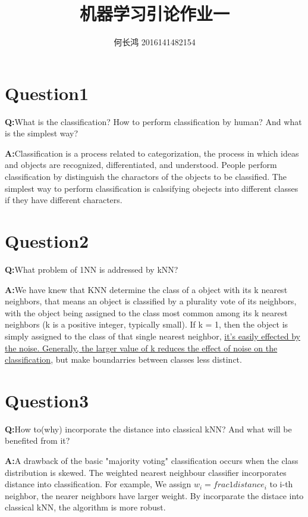 \documentclass{xcumcmart}
\title{机器学习引论作业一}
\author{何长鸿 2016141482154}
\begin{document}
\renewcommand\arraystretch{2}
\maketitle
\section{Question1}
\textbf{Q:}What is the classification? How to perform classification by human? And what is the simplest way?\\
\par \textbf{A:}Classification is a process related to categorization, the process in which ideas and objects are recognized, differentiated, and understood. People perform classification by distinguish the charactors of the objects to be classified. The simplest way to perform classification is calssifying obejects into different classes if they have different characters.

\section{Question2}
\textbf{Q:}What problem of 1NN is addressed by kNN?\\
\par \textbf{A:}We have knew that KNN determine the class of a object with its k nearest neighbors, that means an object is classified by a plurality vote of its neighbors, with the object being assigned to the class most common among its k nearest neighbors (k is a positive integer, typically small). If k = 1, then the object is simply assigned to the class of that single nearest neighbor, \uline{it's easily effected by the noise. Generally, the larger value of k reduces the effect of noise on the classification}, but make boundarries between classes less distinct.

\section{Question3}
\textbf{Q:}How to(why) incorporate the distance into classical kNN? And what will be benefited from it?\\
\par \textbf{A:}A drawback of the basic "majority voting" classification occurs when the class distribution is skewed. The weighted nearest neighbour classifier incorporates distance into classification. For example, We assign $w_i = frac{1}{distance_i}$ to i-th neighbor, the nearer neighbors have larger weight. By incorparate the distace into classical kNN, the algorithm is more robust.
\end{document}
